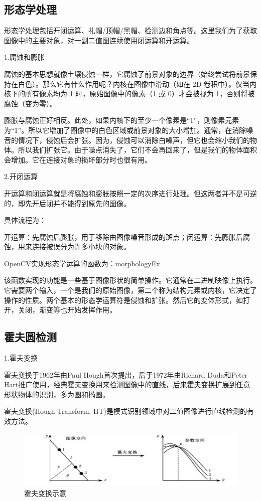 \subsection{形态学处理}

形态学处理包括开闭运算、礼帽/顶帽/黑帽、检测边和角点等。这里我们为了获取图像中的主要对象，对一副二值图连续使用闭运算和开运算。

1.腐蚀和膨胀

腐蚀的基本思想就像土壤侵蚀一样，它腐蚀了前景对象的边界（始终尝试将前景保持在白色）。那么它有什么作用呢？内核在图像中滑动（如在 2D 卷积中）。仅当内核下的所有像素均为 1 时，原始图像中的像素（1 或 0）才会被视为 1，否则将被腐蚀（变为零）。

膨胀与腐蚀正好相反。此处，如果内核下的至少一个像素是“1”，则像素元素为“1”。所以它增加了图像中的白色区域或前景对象的大小增加。通常，在消除噪音的情况下，侵蚀后会扩张。因为，侵蚀可以消除白噪声，但它也会缩小我们的物体。所以我们扩张它。由于噪点消失了，它们不会再回来了，但是我们的物体面积会增加。它在连接对象的损坏部分时也很有用。

2.开闭运算

开运算和闭运算就是将腐蚀和膨胀按照一定的次序进行处理。但这两者并不是可逆的，即先开后闭并不能得到原先的图像。

具体流程为：

开运算：先腐蚀后膨胀，用于移除由图像噪音形成的斑点；闭运算：先膨胀后腐蚀，用来连接被误分为许多小块的对象。

OpenCV实现形态学运算的函数为：morphologyEx

该函数实现的功能是一些基于图像形状的简单操作。它通常在二进制映像上执行。它需要两个输入，一个是我们的原始图像，第二个称为结构元素或内核，它决定了操作的性质。两个基本的形态学运算符是侵蚀和扩张。然后它的变体形式，如打开，关闭，渐变等也开始发挥作用。

\subsection{霍夫圆检测}

1.霍夫变换

霍夫变换于1962年由Paul Hough首次提出，后于1972年由Richard Duda和Peter Hart推⼴使⽤，经典霍夫变换⽤来检测图像中的直线，后来霍夫变换扩展到任意形状物体的识别，多为圆和椭圆。

霍夫变换(Hough Transform, HT)是模式识别领域中对二值图像进行直线检测的有效方法\cite{Art2}。

\begin{figure}[ht]
  \centering
  \includegraphics[width=0.8\linewidth]{./Figure/Hough_Transform.png}
  \caption{霍夫变换示意}\label{Fig:img1}
\end{figure}

